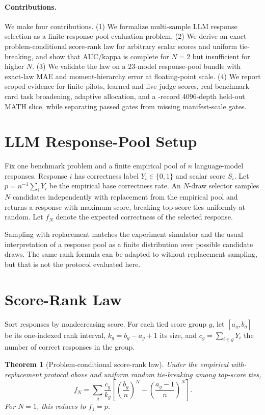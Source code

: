 \documentclass{article}
\newtheorem{theorem}{Theorem}
\begin{document}
\paragraph{Contributions.}
We make four contributions. (1) We formalize multi-sample LLM response
selection as a finite response-pool evaluation problem. (2) We derive an exact
problem-conditional score-rank law for arbitrary scalar scores and uniform
tie-breaking, and show that AUC/kappa is complete for $N=2$ but insufficient
for higher $N$. (3) We validate the law on a 23-model response-pool bundle
with exact-law MAE \EvidenceCoreMAE{} and moment-hierarchy error at floating-point
scale. (4) We report scoped evidence for finite pilots, learned and live judge
scores, real benchmark-card task broadening, adaptive allocation, and a \EvidenceHeldoutRecords{}-record
4096-depth held-out MATH slice, while separating passed gates from missing
manifest-scale gates.

\section{LLM Response-Pool Setup}

Fix one benchmark problem and a finite empirical pool of $n$ language-model
responses. Response $i$ has correctness label $Y_i\in\{0,1\}$ and scalar
score $S_i$. Let $p=n^{-1}\sum_i Y_i$ be the empirical base correctness rate.
An $N$-draw selector samples $N$ candidates independently with replacement
from the empirical pool and returns a response with maximum score, breaking
top-score ties uniformly at random. Let $f_N$ denote the expected correctness
of the selected response.

Sampling with replacement matches the experiment simulator and the usual
interpretation of a response pool as a finite distribution over possible
candidate draws. The same rank formula can be adapted to without-replacement
sampling, but that is not the protocol evaluated here.

\section{Score-Rank Law}

Sort responses by nondecreasing score. For each tied score group $g$, let
$[a_g,b_g]$ be its one-indexed rank interval, $k_g=b_g-a_g+1$ its size, and
$c_g=\sum_{i\in g}Y_i$ the number of correct responses in the group.

\begin{theorem}[Problem-conditional score-rank law]
\label{thm:selector}
Under the empirical with-replacement protocol above and uniform random
tie-breaking among top-score ties,
\begin{equation}
\label{eq:selector-law}
f_N =
\sum_g \frac{c_g}{k_g}
\left[
\left(\frac{b_g}{n}\right)^N
-
\left(\frac{a_g-1}{n}\right)^N
\right].
\end{equation}
For $N=1$, this reduces to $f_1=p$.
\end{theorem}
\end{document}
